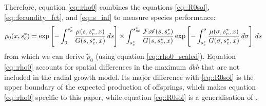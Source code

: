 Therefore, equation \eqref{eq::rho0} combines the equations \eqref{eq::R0sol}, \eqref{eq::fecundity_fct}, and \eqref{eq::s_inf} to measure species performance:
\begin{equation} \label{eq::rho0}
	\rho_0(x, {s}^{*}_c) = \exp \left[-\int_0^{{s}^{*}_c}\frac{\mu(s, {s}^{*}_c, x)}{G(s, {s}^{*}_c, x)} \, ds \right] \times \int_{{s}^{*}_c}^{s_{\infty}^{x}} \frac{\mathcal{F} \mathscr{A}(s, {s}^{*}_c)}{G(s, {s}^{*}_c, x)} \exp \left[-\int_{{s}^{*}_c}^{s} \frac{\mu(\sigma, {s}^{*}_c, x)}{G(\sigma, {s}^{*}_c, x)} \, d\sigma \right] \, ds
\end{equation}
from which we can derive $ \tilde \rho_0 $ (using equation \eqref{eq::rho0_scaled}). Equation \eqref{eq::rho0} accounts for spatial differences in the maximum \textit{dbh} that are not included in the radial growth model. Its major difference with \eqref{eq::R0sol} is the upper boundary of the expected production of offsprings, which makes equation \eqref{eq::rho0} specific to this paper, while equation \eqref{eq::R0sol} is a generalisation of \citet{Purves2009}.
